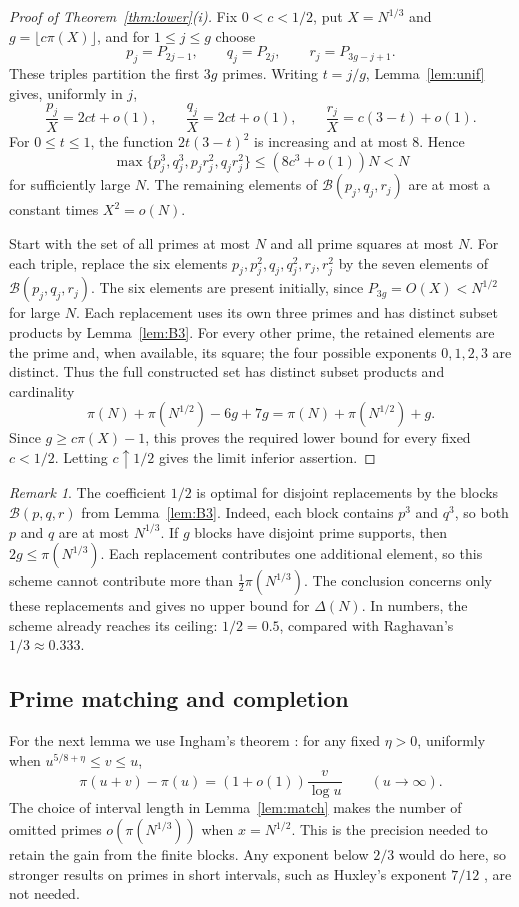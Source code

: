 \documentclass[11pt]{article}
\numberwithin{equation}{section}
\theoremstyle{remark}
\newtheorem{remark}[theorem]{Remark}
\begin{document}
\begin{proof}[Proof of Theorem~\ref{thm:lower}(i)]
Fix $0<c<1/2$, put $X=N^{1/3}$ and $g=\lfloor c\pi(X)\rfloor$, and for $1\le j\le g$ choose
\[
p_j=P_{2j-1},\qquad q_j=P_{2j},\qquad r_j=P_{3g-j+1}.
\]
These triples partition the first $3g$ primes. Writing $t=j/g$, Lemma~\ref{lem:unif} gives, uniformly in $j$,
\[
\frac{p_j}X=2ct+o(1),\qquad\frac{q_j}X=2ct+o(1),\qquad\frac{r_j}X=c(3-t)+o(1).
\]
For $0\le t\le1$, the function $2t(3-t)^2$ is increasing and at most $8$. Hence
\[
\max\{p_j^3,q_j^3,p_jr_j^2,q_jr_j^2\}\le(8c^3+o(1))N<N
\]
for sufficiently large $N$. The remaining elements of $\mathcal B(p_j,q_j,r_j)$ are at most a constant times $X^2=o(N)$.

Start with the set of all primes at most $N$ and all prime squares at most $N$. For each triple, replace the six elements $p_j,p_j^2,q_j,q_j^2,r_j,r_j^2$ by the seven elements of $\mathcal B(p_j,q_j,r_j)$. The six elements are present initially, since $P_{3g}=O(X)<N^{1/2}$ for large $N$. Each replacement uses its own three primes and has distinct subset products by Lemma~\ref{lem:B3}. For every other prime, the retained elements are the prime and, when available, its square; the four possible exponents $0,1,2,3$ are distinct. Thus the full constructed set has distinct subset products and cardinality
\[
\pi(N)+\pi(N^{1/2})-6g+7g=\pi(N)+\pi(N^{1/2})+g.
\]
Since $g\ge c\pi(X)-1$, this proves the required lower bound for every fixed $c<1/2$. Letting $c\uparrow1/2$ gives the limit inferior assertion.
\end{proof}

\begin{remark}\label{rem:opt}
The coefficient $1/2$ is optimal for disjoint replacements by the blocks $\mathcal B(p,q,r)$ from Lemma~\ref{lem:B3}. Indeed, each block contains $p^3$ and $q^3$, so both $p$ and $q$ are at most $N^{1/3}$. If $g$ blocks have disjoint prime supports, then $2g\le\pi(N^{1/3})$. Each replacement contributes one additional element, so this scheme cannot contribute more than $\frac12\pi(N^{1/3})$. The conclusion concerns only these replacements and gives no upper bound for $\Delta(N)$. In numbers, the scheme already reaches its ceiling: $1/2=0.5$, compared with Raghavan's $1/3\approx0.333$.
\end{remark}

\subsection{Prime matching and completion}
For the next lemma we use Ingham's theorem \cite{Ingham}: for any fixed $\eta>0$, uniformly when $u^{5/8+\eta}\le v\le u$,
\begin{equation}\label{eq:ingham}
\pi(u+v)-\pi(u)=(1+o(1))\frac v{\log u}\qquad(u\to\infty).
\end{equation}
The choice of interval length in Lemma~\ref{lem:match} makes the number of omitted primes $o(\pi(N^{1/3}))$ when $x=N^{1/2}$. This is the precision needed to retain the gain from the finite blocks. Any exponent below $2/3$ would do here, so stronger results on primes in short intervals, such as Huxley's exponent $7/12$ \cite{Huxley}, are not needed.
\end{document}
